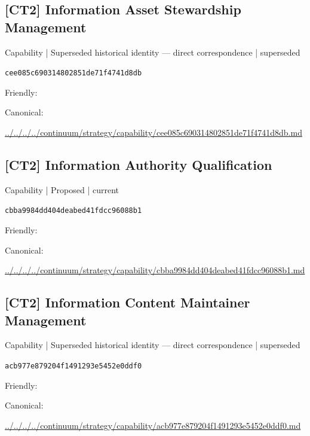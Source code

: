 \documentclass[10pt,a4paper]{article}
\begin{document}
\subsection*{[CT2] Information Asset Stewardship Management}
{\small Capability | Superseded historical identity — direct correspondence | superseded}\par
\texttt{cee085c690314802851de71f4741d8db}\par
Friendly: \par
Canonical: \par
{\footnotesize\url{../../../../continuum/strategy/capability/cee085c690314802851de71f4741d8db.md}}\par
\subsection*{[CT2] Information Authority Qualification}
{\small Capability | Proposed | current}\par
\texttt{cbba9984dd404deabed41fdcc96088b1}\par
Friendly: \par
Canonical: \par
{\footnotesize\url{../../../../continuum/strategy/capability/cbba9984dd404deabed41fdcc96088b1.md}}\par
\subsection*{[CT2] Information Content Maintainer Management}
{\small Capability | Superseded historical identity — direct correspondence | superseded}\par
\texttt{acb977e879204f1491293e5452e0ddf0}\par
Friendly: \par
Canonical: \par
{\footnotesize\url{../../../../continuum/strategy/capability/acb977e879204f1491293e5452e0ddf0.md}}\par
\end{document}
